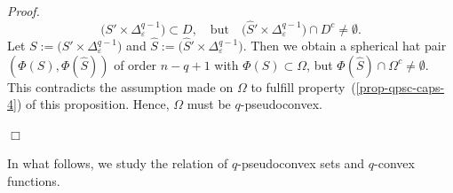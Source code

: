 \documentclass[11pt,a4paper]{article}
\newenvironment{proof}{\noindent\textit{Proof. }}{\hfill $\Box$\linebreak}
\renewcommand{\SS}{\mathbb{S}}
\newcommand{\repa}[1]{\operatorname{Re}(#1)}
\newcommand{\eps}{\varepsilon}
\begin{document}
\begin{proof}
\[
\big(S'\times\Delta_\eps^{q-1}\big) \subset D, \quad \text{but}\quad  \big(\hat S'\times\Delta_\eps^{q-1}\big) \cap D^c \neq \emptyset.
\]
Let $S:=\big(S'\times\Delta_\eps^{q-1}\big)$ and $\hat S:= \big(\hat S'\times\Delta_\eps^{q-1}\big)$. Then we obtain a spherical hat pair $(\Phi(S),\Phi(\hat S))$ of order $n-q+1$ with $\Phi(S) \subset \Omega$, but $\Phi(\hat S) \cap \Omega^c \neq \emptyset$. This contradicts the assumption made on $\Omega$ to fulfill property~(\ref{prop-qpsc-caps-4}) of this proposition. Hence, $\Omega$ must be $q$-pseudoconvex.




\end{proof}

In what follows, we study the relation of $q$-pseudoconvex sets and $q$-convex functions.
\end{document}
